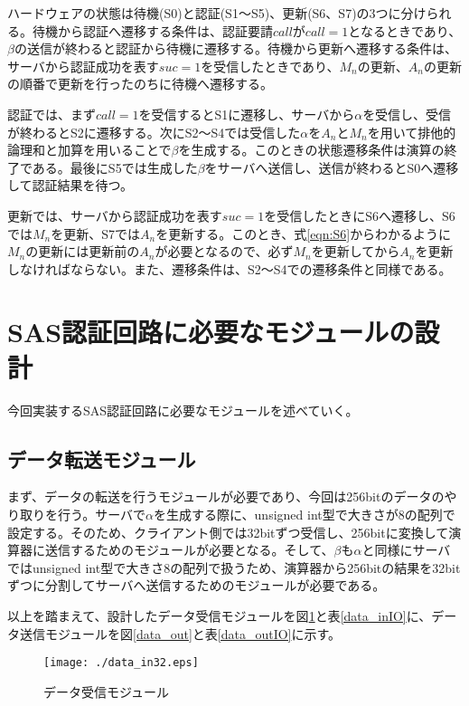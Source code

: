 \documentclass{thesis}
\begin{document}
ハードウェアの状態は待機(S0)と認証(S1～S5)、更新(S6、S7)の3つに分けられる。待機から認証へ遷移する条件は、認証要請$call$が$call = 1$となるときであり、$\beta$の送信が終わると認証から待機に遷移する。待機から更新へ遷移する条件は、サーバから認証成功を表す$suc=1$を受信したときであり、$M_n$の更新、$A_n$の更新の順番で更新を行ったのちに待機へ遷移する。\par
認証では、まず$call = 1$を受信するとS1に遷移し、サーバから$\alpha$を受信し、受信が終わるとS2に遷移する。次にS2～S4では受信した$\alpha$を$A_n$と$M_n$を用いて排他的論理和と加算を用いることで$\beta$を生成する。このときの状態遷移条件は演算の終了である。最後にS5では生成した$\beta$をサーバへ送信し、送信が終わるとS0へ遷移して認証結果を待つ。\par
更新では、サーバから認証成功を表す$suc=1$を受信したときにS6へ遷移し、S6では$M_n$を更新、S7では$A_n$を更新する。このとき、式\ref{eqn:S6}からわかるように$M_n$の更新には更新前の$A_n$が必要となるので、必ず$M_n$を更新してから$A_n$を更新しなければならない。また、遷移条件は、S2～S4での遷移条件と同様である。

\newpage

\section{SAS認証回路に必要なモジュールの設計}
今回実装するSAS認証回路に必要なモジュールを述べていく。\par
\subsection{データ転送モジュール}
まず、データの転送を行うモジュールが必要であり、今回は256bitのデータのやり取りを行う。サーバで$\alpha$を生成する際に、unsigned int型で大きさが8の配列で設定する。そのため、クライアント側では32bitずつ受信し、256bitに変換して演算器に送信するためのモジュールが必要となる。そして、$\beta$も$\alpha$と同様にサーバではunsigned int型で大きさ8の配列で扱うため、演算器から256bitの結果を32bitずつに分割してサーバへ送信するためのモジュールが必要である。\par
以上を踏まえて、設計したデータ受信モジュールを図\ref{data_in}と表\ref{data_inIO}に、データ送信モジュールを図\ref{data_out}と表\ref{data_outIO}に示す。
\begin{figure}[H]
 \center
 \texttt{[image: ./data\_in32.eps]}
 \caption{データ受信モジュール}
 \label{data_in}
\end{figure}
\end{document}

